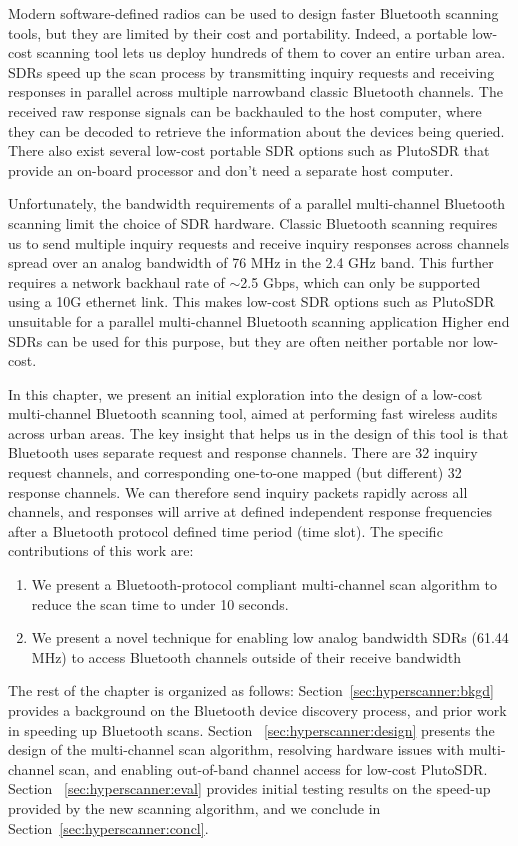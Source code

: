 Modern software-defined radios can be used to design faster Bluetooth scanning tools, but they are limited by their cost and portability.
%
Indeed, a portable low-cost scanning tool lets us deploy hundreds of them to cover an entire urban area.
%
SDRs speed up the scan process by transmitting inquiry requests and receiving responses in parallel across multiple narrowband classic Bluetooth channels.
%
The received raw response signals can be backhauled to the host computer, where they can be decoded to retrieve the information about the devices being queried.
%
There also exist several low-cost portable SDR options such as PlutoSDR that provide an on-board processor and don't need a separate host computer.

%
Unfortunately, the bandwidth requirements of a parallel multi-channel Bluetooth scanning limit the choice of SDR hardware.
%
Classic Bluetooth scanning requires us to send multiple inquiry requests and receive inquiry responses across channels spread over an analog bandwidth of 76 MHz in the 2.4 GHz band. 
%
This further requires a network backhaul rate of $\sim$2.5 Gbps, which can only be supported using a 10G ethernet link.
%
This makes low-cost SDR options such as PlutoSDR unsuitable for a parallel multi-channel Bluetooth scanning application
%
Higher end SDRs can be used for this purpose, but they are often neither portable nor low-cost.

In this chapter, we present an initial exploration into the design of a low-cost multi-channel Bluetooth scanning tool, aimed at performing fast wireless audits across urban areas.
%
The key insight that helps us in the design of this tool is that Bluetooth uses separate request and response channels.
%
There are 32 inquiry request channels, and corresponding one-to-one mapped (but different) 32 response channels.
%
We can therefore send inquiry packets rapidly across all channels, and responses will arrive at defined independent response frequencies after a Bluetooth protocol defined time period (time slot).
%
The specific contributions of this work are:
\begin{enumerate}
    \item We present a Bluetooth-protocol compliant multi-channel scan algorithm to reduce the scan time to under 10 seconds.
    \item We present a novel technique for enabling low analog bandwidth SDRs (61.44 MHz) to access Bluetooth channels outside of their receive bandwidth
\end{enumerate}

The rest of the chapter is organized as follows: Section~\ref{sec:hyperscanner:bkgd} provides a background on the Bluetooth device discovery process, and prior work in speeding up Bluetooth scans. Section ~\ref{sec:hyperscanner:design} presents the design of the multi-channel scan algorithm, resolving hardware issues with multi-channel scan, and enabling out-of-band channel access for low-cost PlutoSDR. Section ~\ref{sec:hyperscanner:eval} provides initial testing results on the speed-up provided by the new scanning algorithm, and we conclude in Section~\ref{sec:hyperscanner:concl}.